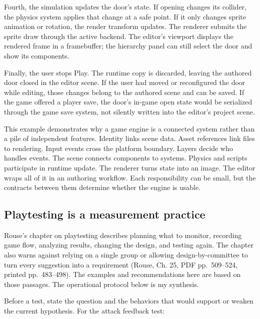 Fourth, the simulation updates the door's state. If opening changes its collider, the physics system applies that change at a safe point. If it only changes sprite animation or rotation, the render transform updates. The renderer submits the sprite draw through the active backend. The editor's viewport displays the rendered frame in a framebuffer; the hierarchy panel can still select the door and show its components.

Finally, the user stops Play. The runtime copy is discarded, leaving the authored door closed in the editor scene. If the user had moved or reconfigured the door while editing, those changes belong to the authored scene and can be saved. If the game offered a player save, the door's in-game open state would be serialized through the game save system, not silently written into the editor's project scene.

This example demonstrates why a game engine is a connected system rather than a pile of independent features. Identity links scene data. Asset references link files to rendering. Input events cross the platform boundary. Layers decide who handles events. The scene connects components to systems. Physics and scripts participate in runtime update. The renderer turns state into an image. The editor wraps all of it in an authoring workflow. Each responsibility can be small, but the contracts between them determine whether the engine is usable.

\subsection{Playtesting is a measurement practice}\label{06-engine-ii-ch041-playtesting-is-a-measurement-practice}

\hypertarget{06-engine-ii-ch041-playtesting-is-a-measurement-practice}{}

Rouse's chapter on playtesting describes planning what to monitor, recording game flow, analyzing results, changing the design, and testing again. The chapter also warns against relying on a single group or allowing design-by-committee to turn every suggestion into a requirement (Rouse, Ch. 25, PDF pp.~509--524, printed pp.~483--498). The examples and recommendations here are based on those passages. The operational protocol below is my synthesis.

Before a test, state the question and the behaviors that would support or weaken the current hypothesis. For the attack feedback test:

